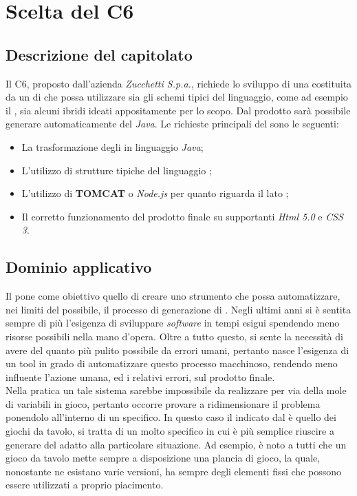 \section{Scelta del  C6}
  \subsection{Descrizione del capitolato}
    Il  C6, proposto dall'azienda \emph{Zucchetti S.p.a.}, richiede lo sviluppo di una  costituita da un  di  che possa utilizzare sia gli schemi tipici
    del linguaggio, come ad esempio il , sia alcuni ibridi ideati appositamente per lo scopo.
    Dal  prodotto sarà possibile generare automaticamente del  \emph{Java}.
    Le richieste principali del  sono le seguenti:
    \begin{itemize}
      \item La trasformazione degli  in linguaggio \emph{Java};
      \item L'utilizzo di strutture tipiche del linguaggio ;
      \item L'utilizzo di \textbf{TOMCAT} o \emph{Node.js} per quanto riguarda il lato ;
      \item Il corretto funzionamento del prodotto finale su  supportanti \emph{Html 5.0} e \emph{CSS 3}.
     \end{itemize}
   \subsection{Dominio applicativo}
    Il  pone come obiettivo quello di creare uno strumento che possa automatizzare, nei limiti del possibile, il processo di generazione di .
    Negli ultimi anni si è sentita sempre di più l'esigenza di sviluppare \emph{software} in tempi esigui spendendo meno risorse possibili nella mano d'opera.
    Oltre a tutto questo, si sente la necessità di avere del  quanto più pulito possibile da errori umani, pertanto nasce l'esigenza di un tool in grado di
    automatizzare questo processo macchinoso, rendendo meno influente l'azione umana, ed i relativi errori, sul prodotto finale. \\
    Nella pratica un tale sistema sarebbe impossibile da realizzare per via della mole di variabili in gioco, pertanto occorre provare a ridimensionare il problema ponendolo
    all'interno di un  specifico.
    In questo caso il  indicato dal  è quello dei giochi da tavolo, si tratta di un  molto specifico in cui è più semplice riuscire a generare del  adatto alla particolare situazione.
    Ad esempio, è noto a tutti che un gioco da tavolo mette sempre a disposizione una plancia di gioco, la quale, nonostante ne esistano varie versioni, ha sempre degli
    elementi fissi che possono essere utilizzati a proprio piacimento.
